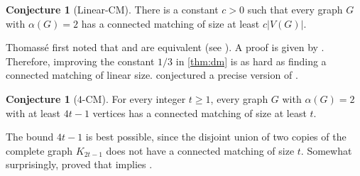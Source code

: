 \documentclass[11pt]{article}
\numberwithin{equation}{section}
\theoremstyle{plain}
\theoremstyle{definition}
\newtheorem{conj}[thm]{Conjecture}
\renewcommand{\geq}{\geqslant}
\newcommand{\conjdefn}[1]{\textcolor{red!50!black}{#1}}
\begin{document}
\begin{conj}[\conjdefn{Linear-CM}]
    \label{conj:linear_cm}
    There is a constant $c > 0$ such that every graph $G$ with $\alpha(G) = 2$ has a connected matching of size at least $c|V(G)|$.
\end{conj}
Thomass\'e first noted that  and  are equivalent (see \citep{furedi2005connected}). A proof is given by \citet{KPT05}. Therefore, improving the constant $1/3$ in \cref{thm:dm} is as hard as finding a connected matching of linear size. \citet{furedi2005connected} conjectured a precise version of .
\begin{conj}[\conjdefn{$\text{4-CM}$}]
    \label{conj:4-CM}
    For every integer $t \geq 1$, every graph $G$ with $\alpha(G) = 2$ with at least $4t - 1$ vertices has a connected matching of size at least $t$.
\end{conj}
The bound $4t - 1$ is best possible, since the disjoint union of two copies of the complete graph $K_{2t - 1}$ does not have a connected matching of size $t$. Somewhat surprisingly,
\citet{cambie2021hadwiger} proved that  implies .
\end{document}

